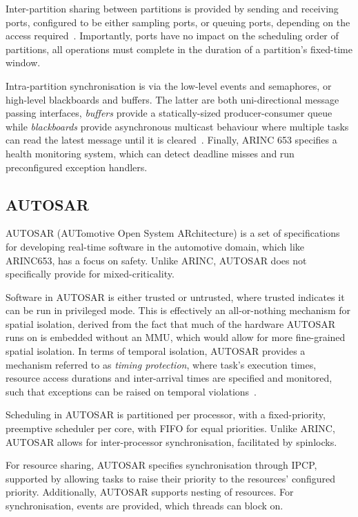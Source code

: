 Inter-partition sharing between partitions is provided by sending and receiving ports, configured to be either
sampling ports, or queuing ports, depending on the access required~\citep{Kinnan_Wlad_04}.
Importantly, ports have no 
impact on the scheduling order of partitions, all operations must complete in the duration of a
partition's fixed-time window.

Intra-partition synchronisation is via the low-level events and semaphores, or high-level
blackboards and buffers. The latter are both uni-directional 
message passing interfaces, \emph{buffers} provide a statically-sized producer-consumer queue while
\emph{blackboards} provide asynchronous multicast behaviour where multiple tasks can read the latest
message until it is cleared~\citep{Zuepke_BL_15}.
Finally, ARINC 653 specifies a health monitoring system, which can detect deadline misses and run
preconfigured exception handlers.

\subsection{AUTOSAR}
\label{sec:os-autosar}

AUTOSAR (AUTomotive Open System ARchitecture) is a set of specifications for developing real-time
software in the automotive domain, which like ARINC653, has a focus on safety. Unlike ARINC, AUTOSAR
does not specifically provide for mixed-criticality.

Software in AUTOSAR is either trusted or untrusted, where trusted indicates it can be run in
privileged mode. This is effectively an all-or-nothing mechanism for spatial isolation, derived
from the fact that much of the hardware AUTOSAR runs on is embedded without an \gls{MMU}, which
would allow for more fine-grained spatial isolation.
In terms of temporal isolation, AUTOSAR provides a mechanism referred to as \emph{timing
protection}, where task's execution times, resource access durations and inter-arrival times are
specified and monitored, such that exceptions can be raised on temporal
violations~\citep{Zuepke_BL_15}. 

Scheduling in AUTOSAR is partitioned per processor, with a  
fixed-priority, preemptive scheduler per core, with \gls{FIFO} for equal priorities. Unlike ARINC,
AUTOSAR allows for inter-processor synchronisation, facilitated by spinlocks. 

For resource sharing, AUTOSAR specifies synchronisation through \gls{IPCP}, supported by allowing
tasks to raise their priority to the resources' configured priority. Additionally, AUTOSAR supports
nesting of resources. For synchronisation, events are provided, which threads can block on.


